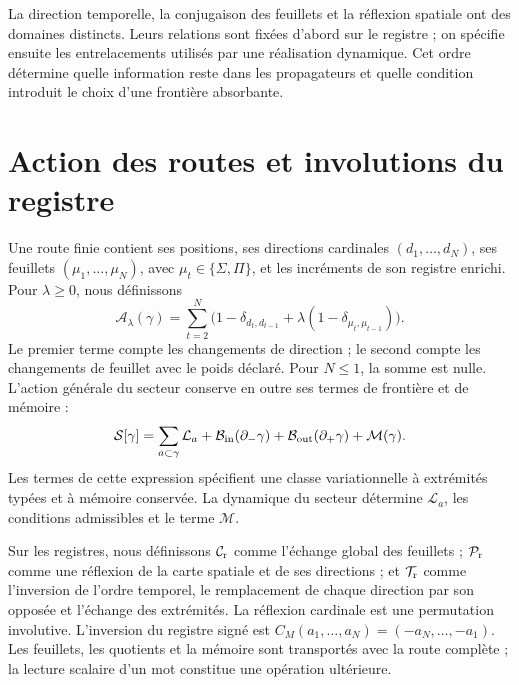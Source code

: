 La direction temporelle, la conjugaison des feuillets et la réflexion spatiale
ont des domaines distincts. Leurs relations sont fixées d'abord sur le registre ;
on spécifie ensuite les entrelacements utilisés par une réalisation
dynamique. Cet ordre détermine quelle information reste dans les propagateurs
et quelle condition introduit le choix d'une frontière absorbante.

\section{Action des routes et involutions du registre}
\label{x_reciprocidad:vii:subsec:accion-bidireccional}

Une route finie contient ses positions, ses directions cardinales
\((d_1,\ldots,d_N)\), ses feuillets \((\mu_1,\ldots,\mu_N)\), avec
\(\mu_t\in\{\Sigma,\Pi\}\), et les incréments de son registre
enrichi. Pour \(\lambda\geq0\), nous définissons
\begin{equation}
 \mathcal A_\lambda(\gamma)
 =\sum_{t=2}^N
 \bigl(1-\delta_{d_t,d_{t-1}}
       +\lambda(1-\delta_{\mu_t,\mu_{t-1}})\bigr).
 \label{x_reciprocidad:vii:eq:accion-ruta-bidireccional}
\end{equation}
Le premier terme compte les changements de direction ; le second compte les changements
de feuillet avec le poids déclaré. Pour \(N\leq1\), la somme est nulle.
L'action générale du secteur conserve en outre ses termes de frontière et de
mémoire :
\begin{equation}
 \mathcal S[\gamma]
 =\sum_{a\subset\gamma}\mathcal L_a
  +\mathcal B_{\rm in}(\partial_-\gamma)
  +\mathcal B_{\rm out}(\partial_+\gamma)
  +\mathcal M(\gamma).
 \label{x_reciprocidad:vii:eq:accion-enriquecida-frontera}
\end{equation}
Les termes de cette expression spécifient une classe variationnelle à
extrémités typées et à mémoire conservée. La dynamique du secteur détermine
\(\mathcal L_a\), les conditions admissibles et le terme \(\mathcal M\).

Sur les registres, nous définissons \(\mathcal C_{\rm r}\) comme l'échange global des feuillets ; \(\mathcal P_{\rm r}\) comme une réflexion de la carte spatiale et de ses directions ; et \(\mathcal T_{\rm r}\) comme l'inversion de l'ordre temporel, le remplacement de chaque direction par son opposée et l'échange des extrémités. La réflexion cardinale est une permutation involutive. L'inversion du registre signé est \(C_M(a_1,\ldots,a_N)=(-a_N,\ldots,-a_1)\). Les feuillets, les quotients et la mémoire sont transportés avec la route complète ; la lecture scalaire d'un mot constitue une opération ultérieure.

